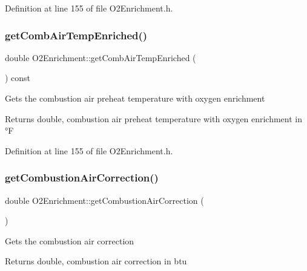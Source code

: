 Definition at line 155 of file O2\+Enrichment.\+h.

\mbox{\label{class_o2_enrichment_ad628ffe961a2733c60e5008fd044eabe}} 
\subsubsection{\texorpdfstring{get\+Comb\+Air\+Temp\+Enriched()}{getCombAirTempEnriched()}\hspace{0.1cm}{\footnotesize\ttfamily [3/3]}}
{\footnotesize\ttfamily double O2\+Enrichment\+::get\+Comb\+Air\+Temp\+Enriched (\begin{DoxyParamCaption}{ }\end{DoxyParamCaption}) const\hspace{0.3cm}{\ttfamily [inline]}}

Gets the combustion air preheat temperature with oxygen enrichment \begin{DoxyReturn}{Returns}
double, combustion air preheat temperature with oxygen enrichment in °F 
\end{DoxyReturn}


Definition at line 155 of file O2\+Enrichment.\+h.

\mbox{\label{class_o2_enrichment_a7ecca6a53529843246555ae33379d464}} 
\subsubsection{\texorpdfstring{get\+Combustion\+Air\+Correction()}{getCombustionAirCorrection()}\hspace{0.1cm}{\footnotesize\ttfamily [1/3]}}
{\footnotesize\ttfamily double O2\+Enrichment\+::get\+Combustion\+Air\+Correction (\begin{DoxyParamCaption}{ }\end{DoxyParamCaption})\hspace{0.3cm}{\ttfamily [inline]}}

Gets the combustion air correction \begin{DoxyReturn}{Returns}
double, combustion air correction in btu 
\end{DoxyReturn}


